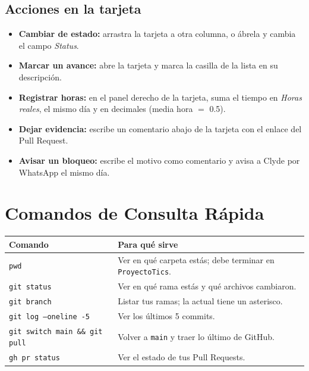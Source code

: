 \documentclass[11pt,a4paper]{article}
\begin{document}
\subsection{Acciones en la tarjeta}
\begin{itemize}[leftmargin=*]
    \item \textbf{Cambiar de estado:} arrastra la tarjeta a otra columna, o ábrela y cambia el campo \textit{Status}.
    \item \textbf{Marcar un avance:} abre la tarjeta y marca la casilla de la lista en su descripción.
    \item \textbf{Registrar horas:} en el panel derecho de la tarjeta, suma el tiempo en \textit{Horas reales}, el mismo día y en decimales (media hora $=$ 0.5).
    \item \textbf{Dejar evidencia:} escribe un comentario abajo de la tarjeta con el enlace del Pull Request.
    \item \textbf{Avisar un bloqueo:} escribe el motivo como comentario y avisa a Clyde por WhatsApp el mismo día.
\end{itemize}

\section{Comandos de Consulta Rápida}
{\small
{}
\noindent\begin{tabularx}{\textwidth}{@{}P{5.6cm} L@{}}
\toprule
{}
\textbf{Comando} & \textbf{Para qué sirve} \\
\midrule
\texttt{pwd} & Ver en qué carpeta estás; debe terminar en \texttt{ProyectoTics}. \\
\texttt{git status} & Ver en qué rama estás y qué archivos cambiaron. \\
\texttt{git branch} & Listar tus ramas; la actual tiene un asterisco. \\
\texttt{git log --oneline -5} & Ver los últimos 5 commits. \\
\texttt{git switch main \&\& git pull} & Volver a \texttt{main} y traer lo último de GitHub. \\
\texttt{gh pr status} & Ver el estado de tus Pull Requests. \\
\bottomrule
\end{tabularx}
}

\end{document}
